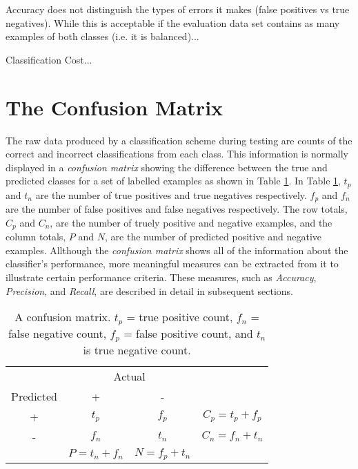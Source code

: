 \documentclass[10pt]{unbthesis}
\begin{document}
Accuracy does not distinguish the types of errors it makes (false
positives vs true negatives). While this is acceptable if the evaluation
data set contains as many examples of both classes (i.e. it is
balanced)...

Classification Cost...

\section*{The Confusion Matrix}
The raw data produced by a classification scheme during testing are
counts of the correct and incorrect classifications from each
class. This information is normally displayed in a \textit{confusion
  matrix} showing the difference between the true and predicted
classes for a set of labelled examples as shown in Table
\ref{tab:confusionmatrix}. In Table \ref{tab:confusionmatrix}, \(t_p\)
and \(t_n\) are the number of true positives and true negatives
respectively. \(f_p\) and \(f_n\) are the number of false positives
and false negatives respectively. The row totals, \(C_p\) and \(C_n\),
are the number of truely positive and negative examples, and the
column totals, \(P\) and \(N\), are the number of predicted positive
and negative examples. Allthough the \textit{confusion matrix} shows
all of the information about the classifier's performance, more
meaningful measures can be extracted from it to illustrate certain
performance criteria. These measures, such as \textit{Accuracy},
\textit{Precision}, and \textit{Recall}, are described in detail in
subsequent sections.

\begin{table}
\centering
  \begin{tabular}{c|c|c|c}
    & \multicolumn{2}{|c|}{Actual} \\ \cline{1-3}
    Predicted & + & - & \\ \hline
    + & \(t_p\)           & \(f_p\)           & \(C_p = t_p + f_p\)  \\ \hline
    - & \(f_n\)           & \(t_n\)           & \(C_n = f_n + t_n\)  \\ \hline
    & \(P = t_n + f_n\) & \(N = f_p + t_n\) \\ \cline{2-3}
  \end{tabular}
  \caption{A confusion matrix. \(t_p\) = true positive count, \(f_n\)
  = false negative count, \(f_p\) = false positive count, and \(t_n\)
  is true negative count.}
  \label{tab:confusionmatrix}
\end{table}
\end{document}
